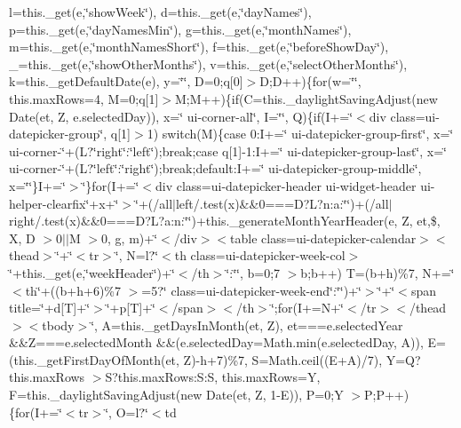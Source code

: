 \begin{DoxyCompactItemize}
l=this.\+\_\+get(e,\char`\"{}show\+Week\char`\"{}), d=this.\+\_\+get(e,\char`\"{}day\+Names\char`\"{}), p=this.\+\_\+get(e,\char`\"{}day\+Names\+Min\char`\"{}), g=this.\+\_\+get(e,\char`\"{}month\+Names\char`\"{}), m=this.\+\_\+get(e,\char`\"{}month\+Names\+Short\char`\"{}), f=this.\+\_\+get(e,\char`\"{}before\+Show\+Day\char`\"{}), \+\_\+=this.\+\_\+get(e,\char`\"{}show\+Other\+Months\char`\"{}), v=this.\+\_\+get(e,\char`\"{}select\+Other\+Months\char`\"{}), k=this.\+\_\+get\+Default\+Date(e), y=\char`\"{}\char`\"{}, D=0;q\mbox{[}0\mbox{]}$>$\+D;\+D++)\{for(w=\char`\"{}\char`\"{}, this.\+max\+Rows=4, M=0;q\mbox{[}1\mbox{]}$>$\+M;\+M++)\{if(\+C=this.\+\_\+daylight\+Saving\+Adjust(new Date(et, Z, e.\+selected\+Day)), x=\char`\"{} ui-\/corner-\/all\char`\"{}, I=\char`\"{}\char`\"{}, Q)\{if(\+I+=\char`\"{}$<$div class=\textquotesingle{}ui-\/datepicker-\/group\char`\"{}, q\mbox{[}1\mbox{]}$>$1) switch(\+M)\{case 0\+:\+I+=\char`\"{} ui-\/datepicker-\/group-\/first\char`\"{}, x=\char`\"{} ui-\/corner-\/\char`\"{}+(\+L?\char`\"{}right\char`\"{}\+:\char`\"{}left\char`\"{});break;case q\mbox{[}1\mbox{]}-\/1\+:\+I+=\char`\"{} ui-\/datepicker-\/group-\/last\char`\"{}, x=\char`\"{} ui-\/corner-\/\char`\"{}+(\+L?\char`\"{}left\char`\"{}\+:\char`\"{}right\char`\"{});break;default\+:\+I+=\char`\"{} ui-\/datepicker-\/group-\/middle\char`\"{}, x=\char`\"{}\char`\"{}\}\+I+=\char`\"{}\textquotesingle{}$>$\char`\"{}\}for(\+I+=\char`\"{}$<$div class=\textquotesingle{}ui-\/datepicker-\/header ui-\/widget-\/header ui-\/helper-\/clearfix\char`\"{}+x+\char`\"{}\textquotesingle{}$>$\char`\"{}+(/all$\vert$left/.\+test(x)\&\&0===\+D?\+L?n\+:a\+:\char`\"{}\char`\"{})+(/all$\vert$right/.\+test(x)\&\&0===\+D?\+L?a\+:n\+:\char`\"{}\char`\"{})+this.\+\_\+generate\+Month\+Year\+Header(e, Z, et,\$, X, D $>$0$\vert$$\vert$\+M $>$0, g, m)+\char`\"{}$<$/div$>$$<$table class=\textquotesingle{}ui-\/datepicker-\/calendar\textquotesingle{}$>$$<$thead$>$\char`\"{}+\char`\"{}$<$tr$>$\char`\"{}, N=l?\char`\"{}$<$th class=\textquotesingle{}ui-\/datepicker-\/week-\/col\textquotesingle{}$>$\char`\"{}+this.\+\_\+get(e,\char`\"{}week\+Header\char`\"{})+\char`\"{}$<$/th$>$\char`\"{}\+:\char`\"{}\char`\"{}, b=0;7 $>$b;b++) T=(b+h)\%7, N+=\char`\"{}$<$th\char`\"{}+((b+h+6)\%7 $>$=5?\char`\"{} class=\textquotesingle{}ui-\/datepicker-\/week-\/end\textquotesingle{}\char`\"{}\+:\char`\"{}\char`\"{})+\char`\"{}$>$\char`\"{}+\char`\"{}$<$span title=\textquotesingle{}\char`\"{}+d\mbox{[}\+T\mbox{]}+\char`\"{}\textquotesingle{}$>$\char`\"{}+p\mbox{[}\+T\mbox{]}+\char`\"{}$<$/span$>$$<$/th$>$\char`\"{};for(\+I+=\+N+\char`\"{}$<$/tr$>$$<$/thead$>$$<$tbody$>$\char`\"{}, A=this.\+\_\+get\+Days\+In\+Month(et, Z), et===e.\+selected\+Year \&\&\+Z===e.\+selected\+Month \&\&(e.\+selected\+Day=\+Math.\+min(e.\+selected\+Day, A)), E=(this.\+\_\+get\+First\+Day\+Of\+Month(et, Z)-\/h+7)\%7, S=\+Math.\+ceil((\+E+\+A)/7), Y=\+Q?this.\+max\+Rows $>$\+S?this.\+max\+Rows\+:\+S\+:\+S, this.\+max\+Rows=\+Y, F=this.\+\_\+daylight\+Saving\+Adjust(new Date(et, Z, 1-\/\+E)), P=0;\+Y $>$\+P;\+P++)\{for(\+I+=\char`\"{}$<$tr$>$\char`\"{}, O=l?\char`\"{}$<$td 
\end{DoxyCompactItemize}
